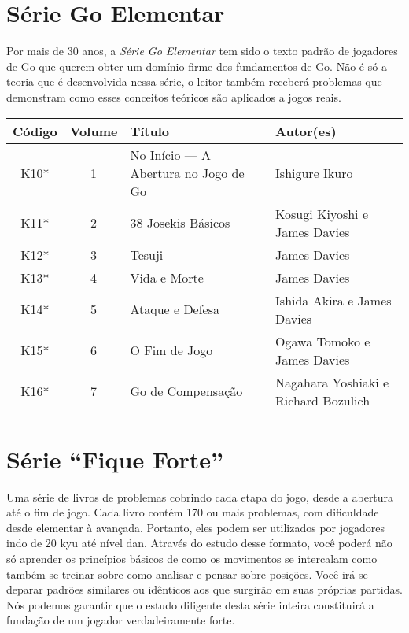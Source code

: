 \section{Série Go Elementar}

Por mais de 30 anos, a \emph{Série Go Elementar} tem sido o texto padrão de jogadores de Go que querem obter um domínio firme dos fundamentos de Go. Não é só a teoria que é desenvolvida nessa série, o leitor também receberá problemas que demonstram como esses conceitos teóricos são aplicados a jogos reais.

\begin{longtable}{c|c|p{45mm}|p{45mm}} 
    \hline
    \textbf{Código} & \textbf{Volume} & \textbf{Título} &\textbf{Autor(es)} \\
    \hline \hline
    K10* & 1 & No Início --- A Abertura no Jogo de Go & Ishigure Ikuro \\
    \hline
    K11* & 2 & 38 Josekis Básicos & Kosugi Kiyoshi e James Davies \\
    \hline
    K12* & 3 & Tesuji & James Davies \\
    \hline
    K13* & 4 & Vida e Morte & James Davies \\
    \hline
    K14* & 5 & Ataque e Defesa & Ishida Akira e James Davies \\
    \hline
    K15* & 6 & O Fim de Jogo & Ogawa Tomoko e James Davies \\
    \hline
    K16* & 7 & Go de Compensação & Nagahara Yoshiaki e Richard Bozulich \\
    \hline
\end{longtable}

\section{Série ``Fique Forte''}

Uma série de livros de problemas cobrindo cada etapa do jogo, desde a abertura até o fim de jogo. Cada livro contém 170 ou mais problemas, com dificuldade desde elementar à avançada. Portanto, eles podem ser utilizados por jogadores indo de 20 kyu até nível dan. Através do estudo desse formato, você poderá não só aprender os princípios básicos de como os movimentos se intercalam como também se treinar sobre como analisar e pensar sobre posições. Você irá se deparar padrões similares ou idênticos aos que surgirão em suas próprias partidas. Nós podemos garantir que o estudo diligente desta série inteira constituirá a fundação de um jogador verdadeiramente forte.

